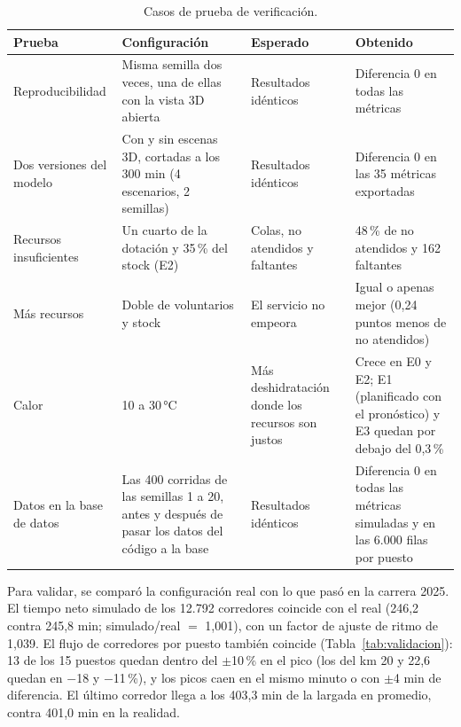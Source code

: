 \documentclass[11pt,a4paper]{article}
\begin{document}
\begin{table}[H]
\centering
\small
\begin{tabular}{P{3cm}P{4.4cm}P{3.6cm}P{4.2cm}}
\toprule
\textbf{Prueba} & \textbf{Configuración} & \textbf{Esperado} & \textbf{Obtenido} \\
\midrule
Reproducibilidad & Misma semilla dos veces, una de ellas con la vista 3D abierta & Resultados idénticos & Diferencia 0 en todas las métricas \\
Dos versiones del modelo & Con y sin escenas 3D, cortadas a los 300 min (4 escenarios, 2 semillas) & Resultados idénticos & Diferencia 0 en las 35 métricas exportadas \\
Recursos insuficientes & Un cuarto de la dotación y 35\,\% del stock (E2) & Colas, no atendidos y faltantes & 48\,\% de no atendidos y 162 faltantes \\
Más recursos & Doble de voluntarios y stock & El servicio no empeora & Igual o apenas mejor (0,24 puntos menos de no atendidos) \\
Calor & 10 a 30\,°C & Más deshidratación donde los recursos son justos & Crece en E0 y E2; E1 (planificado con el pronóstico) y E3 quedan por debajo del 0,3\,\% \\
Datos en la base de datos & Las 400 corridas de las semillas 1 a 20, antes y después de pasar los datos del código a la base & Resultados idénticos & Diferencia 0 en todas las métricas simuladas y en las 6.000 filas por puesto \\
\bottomrule
\end{tabular}
\caption{Casos de prueba de verificación.}
\label{tab:verificacion}
\end{table}

Para validar, se comparó la configuración real con lo que pasó en la carrera 2025. El tiempo neto simulado de los 12.792 corredores coincide con el real (246,2 contra 245,8 min; simulado/real $=$ 1,001), con un factor de ajuste de ritmo de 1,039. El flujo de corredores por puesto también coincide (Tabla~\ref{tab:validacion}): 13 de los 15 puestos quedan dentro del $\pm$10\,\% en el pico (los del km 20 y 22,6 quedan en $-$18 y $-$11\,\%), y los picos caen en el mismo minuto o con $\pm$4 min de diferencia. El último corredor llega a los 403,3 min de la largada en promedio, contra 401,0 min en la realidad.
\end{document}
